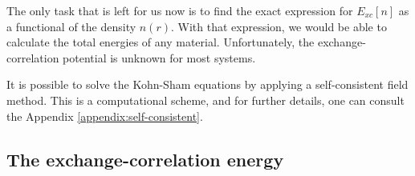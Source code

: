 The only task that is left for us now is to find the exact expression for $E_{xc}[n]$ as a functional of the density $n(r)$. With that expression, we would be able to calculate the total energies of any material. %
Unfortunately, the exchange-correlation potential is unknown for most systems.

It is possible to solve the Kohn-Sham equations by applying a self-consistent field method. This is a computational scheme, and for further details, one can consult the Appendix \ref{appendix:self-consistent}.




\subsection{The exchange-correlation energy}


